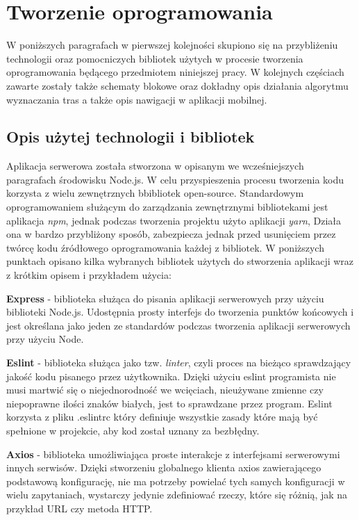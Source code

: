 \chapter{Tworzenie oprogramowania}
\label{cha:tworzenie_oprogramowania}

W poniższych paragrafach w pierwszej kolejności skupiono się na przybliżeniu technologii oraz pomocniczych bibliotek użytych w procesie tworzenia oprogramowania będącego przedmiotem niniejszej pracy. W kolejnych częściach zawarte zostały także schematy blokowe oraz dokładny opis działania algorytmu wyznaczania tras a także opis nawigacji w aplikacji mobilnej.

\section{Opis użytej technologii i bibliotek}

Aplikacja serwerowa została stworzona w opisanym we wcześniejszych paragrafach środowisku Node.js. W celu przyspieszenia procesu tworzenia kodu korzysta z wielu zewnętrznych bbibliotek open-source. Standardowym oprogramowaniem służącym do zarządzania zewnętrznymi bibliotekami jest aplikacja \textit{npm}, jednak podczas tworzenia projektu użyto aplikacji \textit{yarn}, Działa ona w bardzo przybliżony sposób, zabezpiecza jednak przed usunięciem przez twórcę kodu źródłowego oprogramowania każdej z bibliotek. W poniższych punktach opisano kilka wybranych bibliotek użytych do stworzenia aplikacji wraz z krótkim opisem i przykładem użycia:\newline

\textbf{Express} - biblioteka służąca do pisania aplikacji serwerowych przy użyciu biblioteki Node.js. Udostępnia prosty interfejs do tworzenia punktów końcowych i jest określana jako jeden ze standardów podczas tworzenia aplikacji serwerowych przy użyciu Node.\newline

\textbf{Eslint} - biblioteka służąca jako tzw. \textit{linter}, czyli proces na bieżąco sprawdzający jakość kodu pisanego przez użytkownika. Dzięki użyciu eslint programista nie musi martwić się o niejednorodność we wcięciach, nieużywane zmienne czy niepoprawne ilości znaków białych, jest to sprawdzane przez program. Eslint korzysta z pliku .eslintrc który definiuje wszystkie zasady które mają być spełnione w projekcie, aby kod został uznany za bezbłędny.\newline

\textbf{Axios} - biblioteka umożliwiająca proste interakcje z interfejsami serwerowymi innych serwisów. Dzięki stworzeniu globalnego klienta axios zawierającego podstawową konfigurację, nie ma potrzeby powielać tych samych konfiguracji w wielu zapytaniach, wystarczy jedynie zdefiniować rzeczy, które się różnią, jak na przykład URL czy metoda HTTP.\newline

